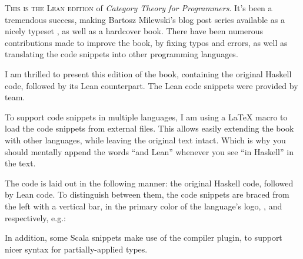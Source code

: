 
\lettrine[lhang=0.17]{T}{his is the Lean edition} of \emph{Category Theory for Programmers}.
It's been a tremendous success, making Bartosz Milewski's blog post series available as a nicely
typeset , as well as a hardcover book. There have been numerous contributions made
to improve the book, by fixing typos and errors, as well as translating the code snippets into
other programming languages.

I am thrilled to present this edition of the book, containing the original Haskell code, followed by
its Lean counterpart. The Lean code snippets were provided by  team.

To support code snippets in multiple languages, I am using a \LaTeX{} macro to load the code snippets
from external files. This allows easily extending the book with other languages, while leaving the
original text intact. Which is why you should mentally append the words ``and Lean'' whenever you see
``in Haskell'' in the text.

The code is laid out in the following manner: the original Haskell code, followed by Lean code.
To distinguish between them, the code snippets are braced from the left with a vertical bar, in the primary
color of the language's logo, ,
and  respectively, e.g.:

\unskip
{}
\NoIndentAfterThis
In addition, some Scala snippets make use of the
 compiler plugin, to support nicer syntax for partially-applied types.
